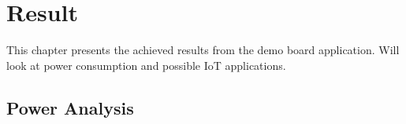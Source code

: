 \chapter{Result}

This chapter presents the achieved results from the demo board application. Will look at power consumption and possible IoT applications.

\section{Power Analysis}